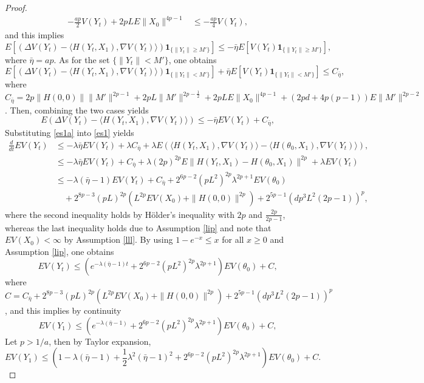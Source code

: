 \documentclass[a4paper]{article}
\begin{document}
\begin{proof}
\begin{align*}
-\frac{ap}{2}V(Y_t) +2pL E\|X_0\|^{4p-1}			& \leq -\frac{ap}{4}V(Y_t),
\end{align*}
and this implies
\[
E\left[\left(\Delta V(Y_t)  - \langle H(Y_t, X_1), \nabla V(Y_t)\rangle \right)\mathbf{1}_{\{\|Y_t\| \geq M'\}}\right] \leq -\bar{\eta} E[V(Y_t)\mathbf{1}_{\{\|Y_t\| \geq M'\}}],
\]
where $\bar{\eta} = ap$. As for the set $\{\|Y_t\| < M'\}$, one obtains
\[
E\left[\left(\Delta V(Y_t)  - \langle H(Y_t, X_1), \nabla V(Y_t)\rangle \right)\mathbf{1}_{\{\|Y_t\| < M'\}}\right] +\bar{\eta} E\left[V(Y_t)\mathbf{1}_{\{\|Y_t\| < M'\}}\right] \leq C_{\bar{\eta} },
\]
where $C_{\bar{\eta} } = 2p\|H(0,0)\| \|M'\|^{2p-1}+2pL \|M'\|^{2p-\frac{1}{2}}+2pL E\|X_0\|^{4p-1}+(2pd+4p(p-1))E\|M'\|^{2p-2}$. Then, combining the two cases yields
\begin{equation}\label{es1a}
 E\left(\Delta V(Y_t)  - \langle H(Y_t, X_1), \nabla V(Y_t)\rangle \right) \leq -\bar{\eta} EV(Y_t) +C_{\bar{\eta} },
\end{equation}
 Substituting \eqref{es1a} into \eqref{es1} yields
\begin{align*}		
\frac{d}{dt} E V(Y_t)	& \leq  -\lambda\bar{\eta} EV(Y_t) +\lambda C_{\bar{\eta} }+\lambda  E\left(\langle H(Y_t, X_1), \nabla V(Y_t)\rangle  - \langle H(\theta_0, X_1), \nabla V(Y_t)\rangle \right),\\
			& \leq  -\lambda\bar{\eta} EV(Y_t)+ C_{\bar{\eta} }+\lambda(2p)^{2p}E\|H(Y_t, X_1) - H(\theta_0, X_1)\|^{2p} +\lambda EV(Y_t)\\
			& \leq -\lambda (\bar{\eta} -1) EV(Y_t) +  C_{\bar{\eta} }+2^{6p-2}( pL^2)^{2p} \lambda^{2p+1}EV(\theta_0) \\
			& \hspace{1em} +2^{8p-3}(pL)^{2p}(L^{2p}EV(X_0)+\|H(0,0)\|^{2p})+2^{5p-1}(dp^3L^2(2p-1))^p,
\end{align*}
where the second inequality holds by H\"{o}lder's inequality with $2p$ and $\frac{2p}{2p-1}$, whereas the last inequality holds due to Assumption \ref{lip} and note that $EV(X_0)<\infty$ by Assumption \ref{lll}. By using $1-e^{-x} \leq x$ for all $x \geq 0$ and Assumption \ref{lip}, one obtains
\[
E V(Y_t) \leq (e^{-\lambda (\bar{\eta} -1)t}+2^{6p-2}(  pL^2)^{2p} \lambda^{2p+1}) E V(\theta_0) + C,
\]
where $C =   C_{\bar{\eta} }+2^{8p-3}(pL)^{2p}(L^{2p}EV(X_0)+\|H(0,0)\|^{2p})+2^{5p-1}(dp^3L^2(2p-1))^p$, and this implies by continuity
\[
E V(Y_1) \leq (e^{-\lambda (\bar{\eta} -1)}+2^{6p-2}(pL^2)^{2p} \lambda^{2p+1}) E V(\theta_0) + C,
\]
Let $p> 1/a$, then by Taylor expansion,
\[
E V(Y_1) \leq \left(1-\lambda (\bar{\eta} -1)+\frac{1}{2}\lambda^2(\bar{\eta} -1)^2+2^{6p-2}(pL^2)^{2p}\lambda^{2p+1}  \right) E V(\theta_0) + C.
\]
\end{proof}
\end{document}
